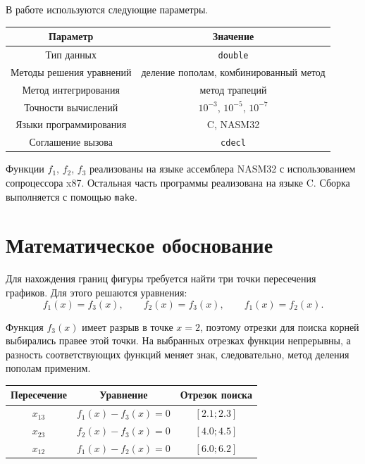 \documentclass[a4paper,12pt,titlepage,final]{article}
\begin{document}
В работе используются следующие параметры.

\begin{center}
\begin{tabular}{|c|c|}
\hline
Параметр & Значение \\
\hline
Тип данных & \texttt{double} \\
\hline
Методы решения уравнений & деление пополам, комбинированный метод \\
\hline
Метод интегрирования & метод трапеций \\
\hline
Точности вычислений & $10^{-3}$, $10^{-5}$, $10^{-7}$ \\
\hline
Языки программирования & C, NASM32 \\
\hline
Соглашение вызова & \texttt{cdecl} \\
\hline
\end{tabular}
\end{center}

Функции $f_1$, $f_2$, $f_3$ реализованы на языке ассемблера NASM32 с использованием сопроцессора x87. Остальная часть программы реализована на языке C. Сборка выполняется с помощью \texttt{make}.

\newpage

\section{Математическое обоснование}

Для нахождения границ фигуры требуется найти три точки пересечения графиков. Для этого решаются уравнения:
\[
    f_1(x)=f_3(x), \qquad f_2(x)=f_3(x), \qquad f_1(x)=f_2(x).
\]

Функция $f_3(x)$ имеет разрыв в точке $x=2$, поэтому отрезки для поиска корней выбирались правее этой точки. На выбранных отрезках функции непрерывны, а разность соответствующих функций меняет знак, следовательно, метод деления пополам применим.

\begin{center}
\begin{tabular}{|c|c|c|}
\hline
Пересечение & Уравнение & Отрезок поиска \\
\hline
$x_{13}$ & $f_1(x)-f_3(x)=0$ & $[2.1;2.3]$ \\
\hline
$x_{23}$ & $f_2(x)-f_3(x)=0$ & $[4.0;4.5]$ \\
\hline
$x_{12}$ & $f_1(x)-f_2(x)=0$ & $[6.0;6.2]$ \\
\hline
\end{tabular}
\end{center}
\end{document}
